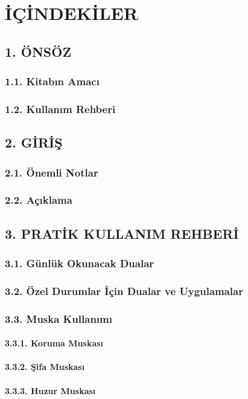 \documentclass[12pt,a4paper]{article}
\begin{document}
\section{İÇİNDEKİLER}
\subsection{1. ÖNSÖZ}
\subsubsection{1.1. Kitabın Amacı}
\subsubsection{1.2. Kullanım Rehberi}
\subsection{2. GİRİŞ}
\subsubsection{2.1. Önemli Notlar}
\subsubsection{2.2. Açıklama}
\subsection{3. PRATİK KULLANIM REHBERİ}
\subsubsection{3.1. Günlük Okunacak Dualar}
\subsubsection{3.2. Özel Durumlar İçin Dualar ve Uygulamalar}
\subsubsection{3.3. Muska Kullanımı}
\paragraph{3.3.1. Koruma Muskası}
\paragraph{3.3.2. Şifa Muskası}
\paragraph{3.3.3. Huzur Muskası}
\end{document}
